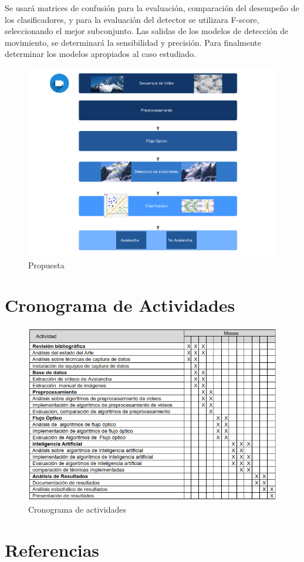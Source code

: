 \documentclass[a4paper,11pt]{report}
\begin{document}
Se usará matrices de confusión para la evaluación, comparación del desempeño de los clasificadores, y para la evaluación del detector se utilizara F-score, seleccionando el mejor subconjunto. Las salidas de los modelos de detección de movimiento, se determinará la sensibilidad y precisión. Para finalmente determinar los modelos apropiados al caso estudiado.



\begin{figure}[h]
	\centering
	\includegraphics[scale=1.1]{propuesta}
	\caption{Propuesta}
	\label{fig:Propuesta }
\end{figure}




\chapter{Cronograma de Actividades}

\begin{figure}[h]
	\centering
	\includegraphics[scale=0.7]{cronograma}
	\caption{Cronograma de actividades}
	\label{fig:Cronograma }
\end{figure}


\chapter{Referencias}

%



\vspace{1cm}
\end{document}
